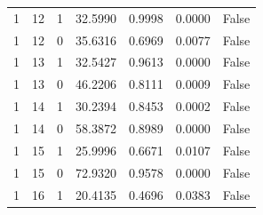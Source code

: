 \documentclass[11pt, a4paper]{article}
\begin{document}
\begin{center}
\begin{tabular}{|c|c|c|c|c|c|c|}
1 & 12 & 1 & 32.5990 & 0.9998 & 0.0000 & False \\
1 & 12 & 0 & 35.6316 & 0.6969 & 0.0077 & False \\
1 & 13 & 1 & 32.5427 & 0.9613 & 0.0000 & False \\
1 & 13 & 0 & 46.2206 & 0.8111 & 0.0009 & False \\
1 & 14 & 1 & 30.2394 & 0.8453 & 0.0002 & False \\
1 & 14 & 0 & 58.3872 & 0.8989 & 0.0000 & False \\
1 & 15 & 1 & 25.9996 & 0.6671 & 0.0107 & False \\
1 & 15 & 0 & 72.9320 & 0.9578 & 0.0000 & False \\
1 & 16 & 1 & 20.4135 & 0.4696 & 0.0383 & False \\

\end{tabular}
\end{center}
\end{document}
